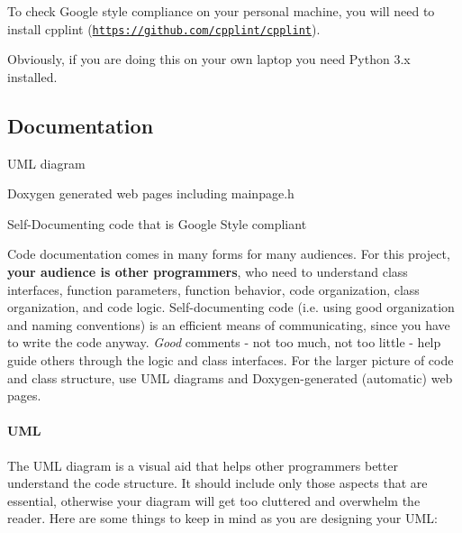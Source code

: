 To check Google style compliance on your personal machine, you will need to install cpplint (\href{https://github.com/cpplint/cpplint}{\tt https\+://github.\+com/cpplint/cpplint}).

Obviously, if you are doing this on your own laptop you need Python 3.\+x installed.





\subsection*{Documentation}


\begin{DoxyItemize}
\item U\+ML diagram
\item Doxygen generated web pages including mainpage.\+h
\item Self-\/\+Documenting code that is Google Style compliant
\end{DoxyItemize}

Code documentation comes in many forms for many audiences. For this project, {\bfseries your audience is other programmers}, who need to understand class interfaces, function parameters, function behavior, code organization, class organization, and code logic. Self-\/documenting code (i.\+e. using good organization and naming conventions) is an efficient means of communicating, since you have to write the code anyway. {\itshape Good} comments -\/ not too much, not too little -\/ help guide others through the logic and class interfaces. For the larger picture of code and class structure, use U\+ML diagrams and Doxygen-\/generated (automatic) web pages.

\paragraph*{U\+ML}

The U\+ML diagram is a visual aid that helps other programmers better understand the code structure. It should include only those aspects that are essential, otherwise your diagram will get too cluttered and overwhelm the reader. Here are some things to keep in mind as you are designing your U\+ML\+:


